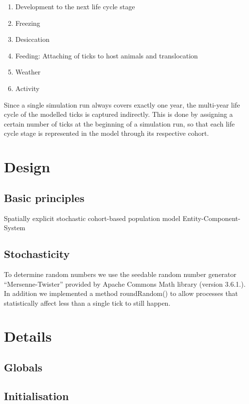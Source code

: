 \documentclass[a4paper, 11pt]{scrartcl}
\begin{document}
\begin{enumerate}
	\item Development to the next life cycle stage
	\item Freezing
	\item Desiccation
	\item Feeding: Attaching of ticks to host animals and translocation
	\item Weather
	\item Activity
\end{enumerate}

Since a single simulation run always covers exactly one year, the multi-year life cycle of the modelled ticks is captured indirectly.
This is done by assigning a certain number of ticks at the beginning of a simulation run, so that each life cycle stage is represented in
the model through its respective cohort.


\section{Design}


\subsection{Basic principles}
Spatially explicit stochastic cohort-based population model
Entity-Component-System

\subsection{Stochasticity}
To determine random numbers we use the seedable random number generator ``Mersenne-Twister'' provided by Apache Commons Math library
(version 3.6.1.). In addition we implemented a method roundRandom() to allow processes that statistically affect less than
a single tick to still happen.


\section{Details}

\subsection{Globals}

\subsection{Initialisation}
\end{document}
